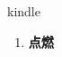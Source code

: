 
\begin{frame}
{\huge kindle}
\begin{center}
\begin{enumerate}\Large
  \item \textbf{点燃}
\end{enumerate}
\end{center}
\end{frame}
